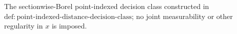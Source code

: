 The sectionwise-Borel point-indexed decision class constructed in \(\mathrm{def:point\text{-}indexed\text{-}distance\text{-}decision\text{-}class}\); no joint measurability or other regularity in \(x\) is imposed.